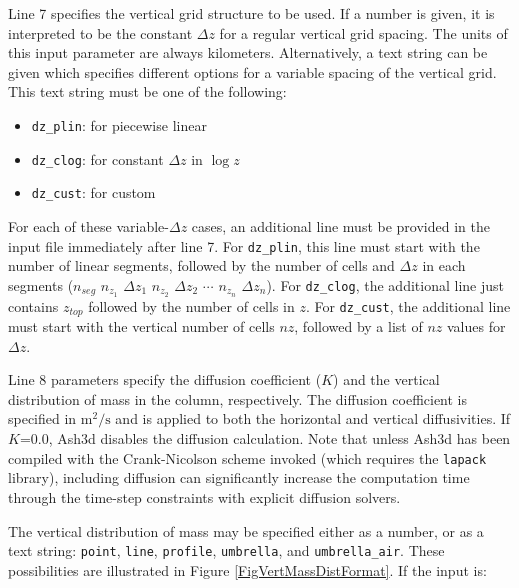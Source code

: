 Line 7 specifies the vertical grid structure to be used.  If a number is
given, it is interpreted to be the constant $\Delta z$ for a regular vertical
grid spacing.
The units of this input parameter are always kilometers.
Alternatively, a text string can be given which specifies
different options for a variable spacing of the vertical grid.  This text
string must be one of the following:
\begin{itemize}
\item \texttt{dz\_plin}: for piecewise linear
\item \texttt{dz\_clog}: for constant $\Delta z$ in $\log z$
\item \texttt{dz\_cust}: for custom
\end{itemize}
For each of these variable-$\Delta z$ cases, an additional line must be
provided in the input file immediately after line 7.  For \texttt{dz\_plin},
this line must start with the number of linear segments, followed by the
number of cells and $\Delta z$ in each segments
($n_{seg}$ $n_{z_1}$ $\Delta z_1$ $n_{z_2}$ $\Delta z_2$ $\cdots$ $n_{z_n}$ $\Delta z_n$).
For \texttt{dz\_clog}, the additional line just contains $z_{top}$ followed by
the number of cells in $z$.
For \texttt{dz\_cust}, the additional line must start with the vertical
number of cells $nz$, followed by a list of $nz$ values for
$\Delta z$.

Line 8 parameters specify the diffusion coefficient ($K$) and the
vertical distribution of mass in the column, respectively. The diffusion
coefficient is specified in $\mathrm{m^2/s}$ and is applied to both the
horizontal and vertical diffusivities.  If $K$=0.0,  Ash3d disables the
diffusion calculation.  Note that unless Ash3d has been
compiled with the Crank-Nicolson scheme invoked (which requires the \texttt{lapack}
library), including diffusion can significantly increase the computation time
through the time-step constraints with explicit diffusion solvers.

The vertical distribution of mass may be specified either as a number, or as a
text string: \texttt{point}, \texttt{line},
\texttt{profile}, \texttt{umbrella}, and \texttt{umbrella\_air}.
These possibilities are illustrated in Figure \ref{FigVertMassDistFormat}.  If the input is:

